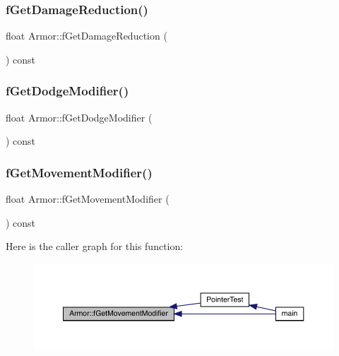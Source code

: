 \subsubsection{\texorpdfstring{f\+Get\+Damage\+Reduction()}{fGetDamageReduction()}}
{\footnotesize\ttfamily float Armor\+::f\+Get\+Damage\+Reduction (\begin{DoxyParamCaption}{ }\end{DoxyParamCaption}) const}

\mbox{\label{class_armor_a2eab88550e74345eef13e2a279a2f995}} 
\subsubsection{\texorpdfstring{f\+Get\+Dodge\+Modifier()}{fGetDodgeModifier()}}
{\footnotesize\ttfamily float Armor\+::f\+Get\+Dodge\+Modifier (\begin{DoxyParamCaption}{ }\end{DoxyParamCaption}) const}

\mbox{\label{class_armor_a788fee5745a82a7ffc587aa4938200dc}} 
\subsubsection{\texorpdfstring{f\+Get\+Movement\+Modifier()}{fGetMovementModifier()}}
{\footnotesize\ttfamily float Armor\+::f\+Get\+Movement\+Modifier (\begin{DoxyParamCaption}{ }\end{DoxyParamCaption}) const}

Here is the caller graph for this function\+:
\nopagebreak
\begin{figure}[H]
\begin{center}
\leavevmode
\includegraphics[width=350pt]{d9/d76/class_armor_a788fee5745a82a7ffc587aa4938200dc_icgraph}
\end{center}
\end{figure}
\mbox{\label{class_armor_a731bb4d1fe53070f30a336db82fada2c}} 
